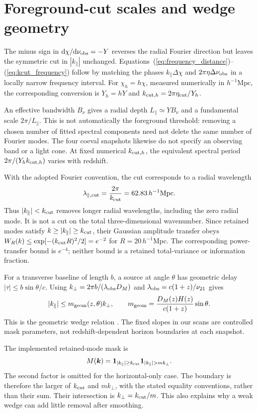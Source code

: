 \section{Foreground-cut scales and wedge geometry}\label{app:kcut}
The minus sign in $\mathrm{d}\chi/\mathrm{d}\nu_{\rm obs}=-Y$ reverses the radial Fourier direction but leaves the symmetric cut in $|k_\parallel|$ unchanged. Equations~(\ref{eq:frequency_distance})--(\ref{eq:kcut_frequency}) follow by matching the phases $k_\parallel\Delta\chi$ and $2\pi\eta\Delta\nu_{\rm obs}$ in a locally narrow frequency interval. For $\chi_h=h\chi$, measured numerically in $h^{-1}\mathrm{Mpc}$, the corresponding conversion is $Y_h=hY$ and $k_{{\rm cut},h}=2\pi\eta_{\rm cut}/Y_h$.

An effective bandwidth $B_\nu$ gives a radial depth $L_\parallel\simeq YB_\nu$ and a fundamental scale $2\pi/L_\parallel$. This is not automatically the foreground threshold: removing a chosen number of fitted spectral components need not delete the same number of Fourier modes. The four coeval snapshots likewise do not specify an observing band or a light cone. At fixed numerical $k_{{\rm cut},h}$, the equivalent spectral period $2\pi/(Y_hk_{{\rm cut},h})$ varies with redshift.

With the adopted Fourier convention, the cut corresponds to a radial wavelength
\begin{equation}
\lambda_{\parallel,\rm cut}=\frac{2\pi}{k_{\rm cut}}
=62.83\,h^{-1}\mathrm{Mpc}.
\end{equation}
Thus $|k_\parallel|<k_{\rm cut}$ removes longer radial wavelengths, including the zero radial mode. It is not a cut on the total three-dimensional wavenumber. Since retained modes satisfy $k\geq |k_\parallel|\geq k_{\rm cut}$, their Gaussian amplitude transfer obeys $W_R(k)\leq\exp[-(k_{\rm cut}R)^2/2]=e^{-2}$ for $R=20\,h^{-1}\mathrm{Mpc}$. The corresponding power-transfer bound is $e^{-4}$; neither bound is a retained total-variance or information fraction.

For a transverse baseline of length $b$, a source at angle $\theta$ has geometric delay $|\tau|\leq b\sin\theta/c$. Using $k_\perp=2\pi b/(\lambda_{\rm obs}D_M)$ and $\lambda_{\rm obs}=c(1+z)/\nu_{21}$ gives
\begin{equation}
|k_\parallel|\leq m_{\rm geom}(z,\theta)k_\perp,\qquad
m_{\rm geom}=\frac{D_M(z)H(z)}{c(1+z)}\sin\theta.
\end{equation}
This is the geometric wedge relation \citep{SeoHirata2016Wedge}. The fixed slopes in our scans are controlled mask parameters, not redshift-dependent horizon boundaries at each snapshot.

The implemented retained-mode mask is
\begin{equation}
M(\boldsymbol k)=\boldsymbol 1_{|k_\parallel|\geq k_{\rm cut}}
\boldsymbol 1_{|k_\parallel|>mk_\perp}.
\end{equation}
The second factor is omitted for the horizontal-only case. The boundary is therefore the larger of $k_{\rm cut}$ and $mk_\perp$, with the stated equality conventions, rather than their sum. Their intersection is $k_\perp=k_{\rm cut}/m$. This also explains why a weak wedge can add little removal after smoothing.
